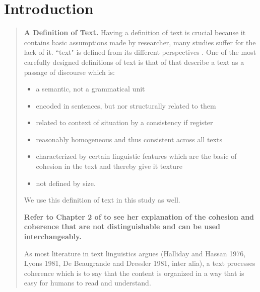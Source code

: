 \chapter{Introduction}
\label{chapt:intro}
\begin{quotation}
 

\textbf{A Definition of Text.}
Having a definition of text is crucial because it contains basic assumptions made by researcher, many studies suffer for the lack of it. 
``text" is defined from its different perspectives \cite{kantor77,simmons79,bamberg83}.
One of the most carefully designed definitions of text is that of  that describe a text as a passage of discourse which is:
\begin{itemize}
\item a semantic, not a grammatical unit
\item encoded in sentences, but nor structurally related to them
\item related to context of situation by a consistency if register
\item reasonably homogeneous and thus consistent across all texts
\item characterized by certain linguistic features which are the basic of cohesion in the text and thereby give it texture
\item not defined by size.
\end{itemize}

We use this definition of text in this study as well. 

\textbf{Refer to Chapter 2 of  to see her explanation of the cohesion and coherence that are not distinguishable and can be used interchangeably. }



As most literature in text linguistics argues (Halliday and Hassan 1976, Lyons 1981, De Beaugrande and Dressler 1981, inter alia), a text processes coherence which is to say that the content is organized in a way that is easy for humans to read and understand. 


\end{quotation}
